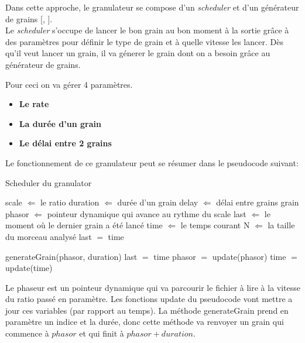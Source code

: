 \documentclass[letterpaper]{article}
\begin{document}
  Dans cette approche, le granulateur se compose d'un \emph{scheduler} et d'un
  générateur de grains [\cite{RealTimeGrainsTSM}, \cite{RealTimeGrains}].\\
  Le \emph{scheduler} s'occupe de lancer le bon grain au bon moment à la sortie grâce à des paramètres
  pour définir le type de grain et à quelle vitesse les lancer. Dès qu'il veut lancer un grain, il
  va génerer le grain dont on a besoin grâce au générateur de grains.

  Pour ceci on va gérer 4 paramètres.
  \begin{itemize}
  \item \textbf{Le rate}
  \item \textbf{La durée d'un grain}
  \item \textbf{Le délai entre 2 grains}
  \end{itemize}

  Le fonctionnement de ce granulateur peut se résumer dans le pseudocode suivant:
\begin{algorithm}                      %
\caption{Scheduler du granulator}      %
\label{alg:granulator}                 %
\begin{algorithmic}                    %

\STATE scale $\Leftarrow$ le ratio  
\STATE duration $\Leftarrow$ durée d'un grain
\STATE delay $\Leftarrow$ délai entre grains grain 
\STATE phasor $\Leftarrow$ pointeur dynamique qui avance au rythme du scale
\STATE last $\Leftarrow$ le moment où le dernier grain a été lancé
\STATE time $\Leftarrow$ le temps courant
\STATE N $\Leftarrow$ la taille du morceau analysé
\STATE last $=$ time


\STATE generateGrain(phasor, duration)
\STATE last $=$ time
\ENDIF
\STATE phasor $=$ update(phasor)
\STATE time $=$ update(time)
\ENDWHILE
  \end{algorithmic}
\end{algorithm}

Le phaseur est un pointeur dynamique qui va parcourir le fichier à lire à la vitesse du ratio passé
en paramètre. Les fonctions update du pseudocode vont mettre a jour ces variables (par rapport au
temps). La méthode generateGrain prend en paramètre un indice et la durée, donc cette méthode va
renvoyer un grain qui commence à $phasor$ et qui finit à $phasor+duration$.
\end{document}
